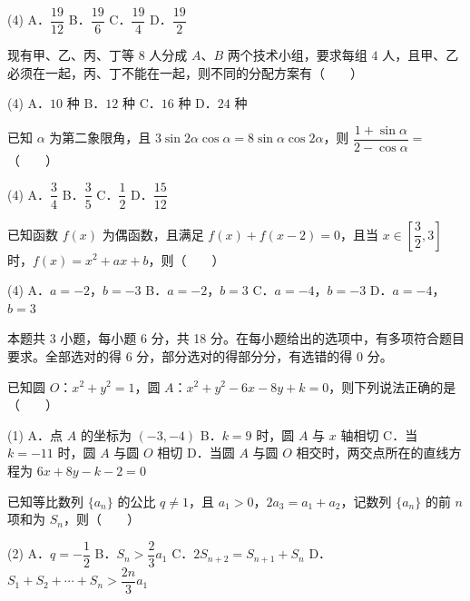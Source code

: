 \begin{gkopts}(4)
\task A．$\dfrac{19}{12}$
\task B．$\dfrac{19}{6}$
\task C．$\dfrac{19}{4}$
\task D．$\dfrac{19}{2}$
\end{gkopts}

现有甲、乙、丙、丁等 $8$ 人分成 $A$、$B$ 两个技术小组，要求每组 $4$ 人，且甲、乙必须在一起，丙、丁不能在一起，则不同的分配方案有（　　）

\begin{gkopts}(4)
\task A．$10$ 种
\task B．$12$ 种
\task C．$16$ 种
\task D．$24$ 种
\end{gkopts}

已知 $\alpha$ 为第二象限角，且 $3\sin2\alpha\cos\alpha=8\sin\alpha\cos2\alpha$，则 $\dfrac{1+\sin\alpha}{2-\cos\alpha}=$（　　）

\begin{gkopts}(4)
\task A．$\dfrac{3}{4}$
\task B．$\dfrac{3}{5}$
\task C．$\dfrac{1}{2}$
\task D．$\dfrac{15}{12}$
\end{gkopts}

已知函数 $f(x)$ 为偶函数，且满足 $f(x)+f(x-2)=0$，且当 $x\in\left[\dfrac{3}{2},3\right]$ 时，$f(x)=x^2+ax+b$，则（　　）

\begin{gkopts}(4)
\task A．$a=-2$，$b=-3$
\task B．$a=-2$，$b=3$
\task C．$a=-4$，$b=-3$
\task D．$a=-4$，$b=3$
\end{gkopts}

\par\medskip


\begin{gktip}
本题共 3 小题，每小题 6 分，共 18 分。在每小题给出的选项中，有多项符合题目要求。全部选对的得 6 分，部分选对的得部分分，有选错的得 0 分。
\end{gktip}

已知圆 $O$：$x^2+y^2=1$，圆 $A$：$x^2+y^2-6x-8y+k=0$，则下列说法正确的是（　　）

\begin{gkopts}(1)
\task A．点 $A$ 的坐标为 $(-3,-4)$
\task B．$k=9$ 时，圆 $A$ 与 $x$ 轴相切
\task C．当 $k=-11$ 时，圆 $A$ 与圆 $O$ 相切
\task D．当圆 $A$ 与圆 $O$ 相交时，两交点所在的直线方程为 $6x+8y-k-2=0$
\end{gkopts}

已知等比数列 $\{a_n\}$ 的公比 $q\ne1$，且 $a_1>0$，$2a_3=a_1+a_2$，记数列 $\{a_n\}$ 的前 $n$ 项和为 $S_n$，则（　　）

\begin{gkopts}(2)
\task A．$q=-\dfrac{1}{2}$
\task B．$S_n>\dfrac{2}{3}a_1$
\task C．$2S_{n+2}=S_{n+1}+S_n$
\task D．$S_1+S_2+\cdots+S_n>\dfrac{2n}{3}a_1$
\end{gkopts}

